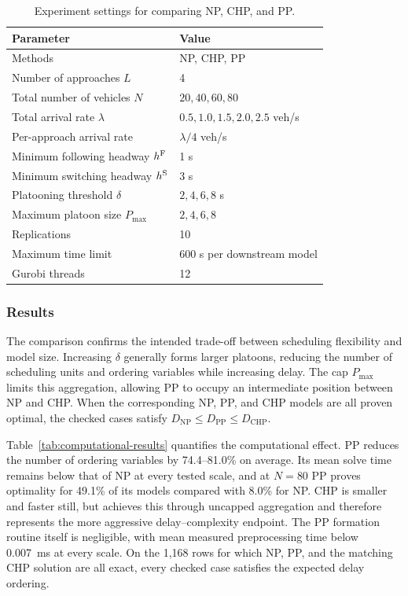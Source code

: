 \begin{table}[t]
  \centering
  \caption{Experiment settings for comparing NP, CHP, and PP.}
  \label{tab:pp-setting}
  \begin{tabular}{ll}
    \toprule
    Parameter & Value \\
    \midrule
    Methods & NP, CHP, PP \\
    Number of approaches \(L\) & 4 \\
    Total number of vehicles \(N\) & \(20,40,60,80\) \\
    Total arrival rate \(\lambda\) & \(0.5,1.0,1.5,2.0,2.5\) veh/s \\
    Per-approach arrival rate & \(\lambda/4\) veh/s \\
    Minimum following headway \(h^{\mathrm{F}}\) & 1 s \\
    Minimum switching headway \(h^{\mathrm{S}}\) & 3 s \\
    Platooning threshold \(\delta\) & \(2,4,6,8\) s \\
    Maximum platoon size \(P_{\max}\) & \(2,4,6,8\) \\
    Replications & 10 \\
    Maximum time limit & 600 s per downstream model \\
    Gurobi threads & 12 \\
    \bottomrule
  \end{tabular}
\end{table}

\subsubsection{Results}
\label{sec:pp-results}

The comparison confirms the intended trade-off between scheduling flexibility and model size. Increasing \(\delta\) generally forms larger platoons, reducing the number of scheduling units and ordering variables while increasing delay. The cap \(P_{\max}\) limits this aggregation, allowing PP to occupy an intermediate position between NP and CHP. When the corresponding NP, PP, and CHP models are all proven optimal, the checked cases satisfy \(D_{\mathrm{NP}}\le D_{\mathrm{PP}}\le D_{\mathrm{CHP}}\).

Table~\ref{tab:computational-results} quantifies the computational effect. PP reduces the number of ordering variables by 74.4--81.0\% on average. Its mean solve time remains below that of NP at every tested scale, and at \(N=80\) PP proves optimality for 49.1\% of its models compared with 8.0\% for NP. CHP is smaller and faster still, but achieves this through uncapped aggregation and therefore represents the more aggressive delay--complexity endpoint. The PP formation routine itself is negligible, with mean measured preprocessing time below 0.007~ms at every scale. On the 1,168 rows for which NP, PP, and the matching CHP solution are all exact, every checked case satisfies the expected delay ordering.

